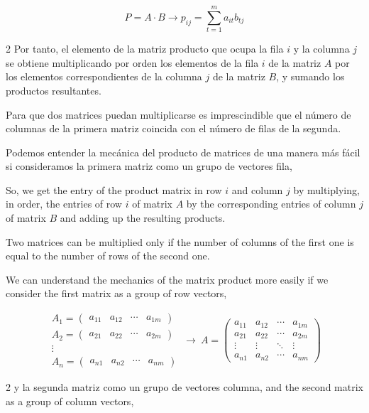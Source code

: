 \begin{equation*}
P=A\cdot B \rightarrow p_{ij}=\sum_{t=1}^m a_{it}b_{tj}
\end{equation*}
\begin{paracol}{2}
Por tanto, el elemento de la matriz producto que ocupa la fila $i$ y la columna $j$ se obtiene multiplicando por orden los elementos de la fila $i$ de la matriz $A$ por los elementos correspondientes de la columna $j$ de la matriz $B$, y sumando los productos resultantes.

Para que dos matrices puedan multiplicarse es imprescindible que el número de columnas de la primera matriz coincida con el número de filas de la segunda.

Podemos entender la mecánica del producto de matrices de una manera más fácil si consideramos  la primera matriz como un grupo de vectores fila,

\switchcolumn
So, we get the entry of the product matrix in row $i$ and column $j$ by multiplying, in order, the entries of row $i$ of matrix $A$ by the corresponding entries of column $j$ of matrix $B$ and adding up the resulting products. 

Two matrices can be multiplied only if the number of columns of the first one is equal to the number of rows of the second one.

We can understand the mechanics of the matrix product more easily if we consider the first matrix as a group of row vectors,  
\end{paracol}

\begin{equation*}
\begin{aligned}
A_1=\begin{pmatrix}
a_{11}& a_{12}& \cdots& a_{1m}
\end{pmatrix}\\
A_2=\begin{pmatrix}
a_{21}& a_{22}& \cdots& a_{2m}
\end{pmatrix}\\
\vdots \  \ \   \  \  \  \ \ \ \ \\
A_n=\begin{pmatrix}
a_{n1}& a_{n2}& \cdots& a_{nm}
\end{pmatrix}
\end{aligned} \ \rightarrow \ 
A=\begin{pmatrix}
a_{11}& a_{12}& \cdots& a_{1m}\\
a_{21}& a_{22}& \cdots& a_{2m}\\
\vdots& \vdots& \ddots& \vdots \\
a_{n1}& a_{n2}& \cdots& a_{nm}
\end{pmatrix}
\end{equation*}
\begin{paracol}{2}
y la segunda matriz como un grupo de vectores columna,
\switchcolumn
and the second matrix as a group of column vectors,  
\end{paracol}

